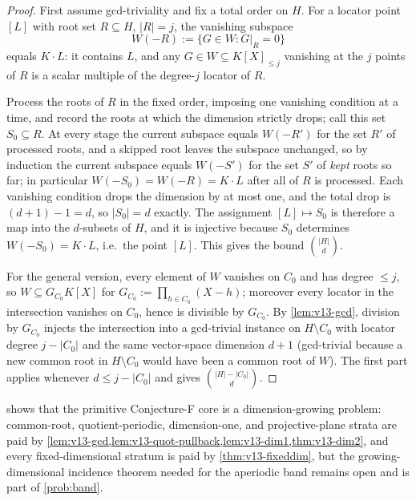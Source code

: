\begin{proof}
First assume gcd-triviality and fix a total order on $H$.  For a locator point $[L]$ with root set $R\subseteq H$, $|R|=j$, the vanishing subspace
\[
        W(-R):=\{G\in W:G|_R=0\}
\]
equals $K\cdot L$: it contains $L$, and any $G\in W\subseteq K[X]_{\le j}$ vanishing at the $j$ points of $R$ is a scalar multiple of the degree-$j$ locator of $R$.

Process the roots of $R$ in the fixed order, imposing one vanishing condition at a time, and record the roots at which the dimension strictly drops; call this set $S_0\subseteq R$.  At every stage the current subspace equals $W(-R')$ for the set $R'$ of processed roots, and a skipped root leaves the subspace unchanged, so by induction the current subspace equals $W(-S')$ for the set $S'$ of \emph{kept} roots so far; in particular $W(-S_0)=W(-R)=K\cdot L$ after all of $R$ is processed.  Each vanishing condition drops the dimension by at most one, and the total drop is $(d+1)-1=d$, so $|S_0|=d$ exactly.  The assignment $[L]\mapsto S_0$ is therefore a map into the $d$-subsets of $H$, and it is injective because $S_0$ determines $W(-S_0)=K\cdot L$, i.e.\ the point $[L]$.  This gives the bound $\binom{|H|}d$.

For the general version, every element of $W$ vanishes on $C_0$ and has degree $\le j$, so $W\subseteq G_{C_0}K[X]$ for $G_{C_0}:=\prod_{h\in C_0}(X-h)$; moreover every locator in the intersection vanishes on $C_0$, hence is divisible by $G_{C_0}$.  By \cref{lem:v13-gcd}, division by $G_{C_0}$ injects the intersection into a gcd-trivial instance on $H\setminus C_0$ with locator degree $j-|C_0|$ and the same vector-space dimension $d+1$ \textup(gcd-trivial because a new common root in $H\setminus C_0$ would have been a common root of $W$\textup).  The first part applies whenever $d\le j-|C_0|$ and gives $\binom{|H|-|C_0|}d$.
\end{proof}

\begin{remark}\label{rem:v13-conjf-open}
 shows that the primitive Conjecture-F core is a dimension-growing problem: common-root, quotient-periodic, dimension-one, and projective-plane strata are paid by \cref{lem:v13-gcd,lem:v13-quot-pullback,lem:v13-dim1,thm:v13-dim2}, and every fixed-dimensional stratum is paid by \cref{thm:v13-fixeddim}, but the growing-dimensional incidence theorem needed for the aperiodic band remains open and is part of \cref{prob:band}.
\end{remark}

